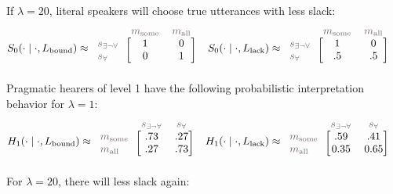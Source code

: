 \documentclass[a4paper, 11pt]{article}
\theoremstyle{Satz}
\newcommand{\state}{\ensuremath{s}\xspace}		%
\newcommand{\mystate}[1]{\ensuremath{\state_{\text{#1}}}\xspace} %
\newcommand{\mylang}[1]{\ensuremath{L_{\text{#1}}}\xspace} %
\newcommand{\messg}{\ensuremath{m}\xspace}		%
\newcommand{\mymessg}[1]{\ensuremath{\messg_{\text{#1}}}\xspace} %
\newcommand{\ssome}{\mystate{\ensuremath{\exists\neg\forall}}}
\newcommand{\sall}{\mystate{\ensuremath{\forall}}}
\newcommand{\msome}{\mymessg{some}}
\newcommand{\mall}{\mymessg{all}}
\newcommand{\Lbound}{\mylang{bound}}
\newcommand{\Llack}{\mylang{lack}}
\newcommand{\mygray}[1]{{\textcolor{mygray}{#1}}}
\begin{document}
If $\lambda = 20$, literal speakers will choose true utterances with less slack:
\begin{align*}
  S_0(\cdot \mid \cdot, \Lbound) & \approx \begin{blockarray}{lcc}
    & \mygray{\msome} & \mygray{\mall} \\
    \begin{block}{l[cc]}
      \mygray{\ssome} & 1 & 0 \\
      \mygray{\sall}  & 0 & 1 \\
    \end{block}
  \end{blockarray} &
  S_0(\cdot \mid \cdot, \Llack) & \approx \begin{blockarray}{lcc}
    & \mygray{\msome} & \mygray{\mall} \\
    \begin{block}{l[cc]}
      \mygray{\ssome} &  1 & 0 \\
      \mygray{\sall}  & .5 & .5 \\
    \end{block}
  \end{blockarray} 
\end{align*}
Pragmatic hearers of level 1 have the following probabilistic interpretation behavior for
$\lambda = 1$:
\begin{align*}
  H_1(\cdot \mid \cdot, \Lbound) & \approx \begin{blockarray}{lcc}
    & \mygray{\ssome} & \mygray{\sall} \\
    \begin{block}{l[cc]}
      \mygray{\msome} & .73 & .27 \\
      \mygray{\mall}  & .27 & .73 \\
    \end{block}
  \end{blockarray} &
  H_1(\cdot \mid \cdot, \Llack) & \approx \begin{blockarray}{lcc}
    & \mygray{\ssome} & \mygray{\sall} \\
    \begin{block}{l[cc]}
      \mygray{\msome} & .59 & .41 \\
      \mygray{\mall}  & 0.35 & 0.65 \\
    \end{block}
  \end{blockarray} 
\end{align*}
For $\lambda = 20$, there will less slack again:
\end{document}
